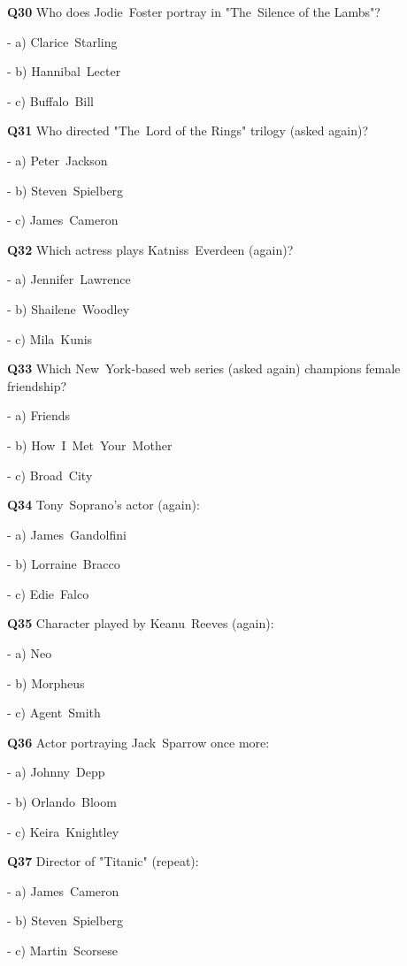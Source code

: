 \textbf{Q30} Who does Jodie Foster portray in "The Silence of the Lambs"?\par
\quad - a) Clarice Starling\par
\quad - b) Hannibal Lecter\par
\quad - c) Buffalo Bill\par

\textbf{Q31} Who directed "The Lord of the Rings" trilogy (asked again)?\par
\quad - a) Peter Jackson\par
\quad - b) Steven Spielberg\par
\quad - c) James Cameron\par

\textbf{Q32} Which actress plays Katniss Everdeen (again)?\par
\quad - a) Jennifer Lawrence\par
\quad - b) Shailene Woodley\par
\quad - c) Mila Kunis\par

\textbf{Q33} Which New York‑based web series (asked again) champions female friendship?\par
\quad - a) Friends\par
\quad - b) How I Met Your Mother\par
\quad - c) Broad City\par

\textbf{Q34} Tony Soprano's actor (again):\par
\quad - a) James Gandolfini\par
\quad - b) Lorraine Bracco\par
\quad - c) Edie Falco\par

\textbf{Q35} Character played by Keanu Reeves (again):\par
\quad - a) Neo\par
\quad - b) Morpheus\par
\quad - c) Agent Smith\par

\textbf{Q36} Actor portraying Jack Sparrow once more:\par
\quad - a) Johnny Depp\par
\quad - b) Orlando Bloom\par
\quad - c) Keira Knightley\par

\textbf{Q37} Director of "Titanic" (repeat):\par
\quad - a) James Cameron\par
\quad - b) Steven Spielberg\par
\quad - c) Martin Scorsese\par

